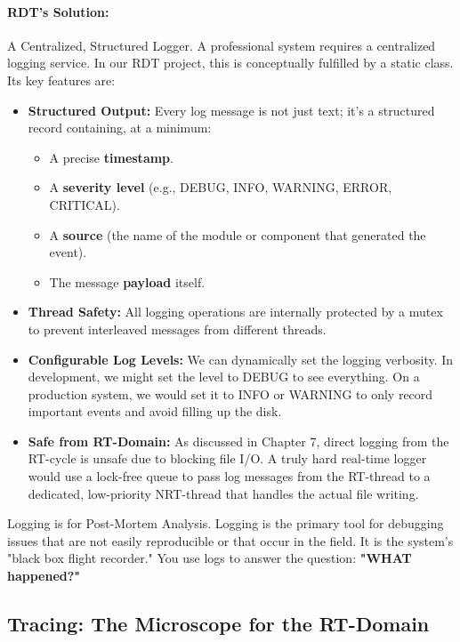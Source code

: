 \paragraph{RDT's Solution:} A Centralized, Structured Logger.
A professional system requires a centralized logging service. In our RDT project, this is conceptually fulfilled by a static  class. Its key features are:
\begin{itemize}
    \item \textbf{Structured Output:} Every log message is not just text; it's a structured record containing, at a minimum:
        \begin{itemize}
            \item A precise \textbf{timestamp}.
            \item A \textbf{severity level} (e.g., DEBUG, INFO, WARNING, ERROR, CRITICAL).
            \item A \textbf{source} (the name of the module or component that generated the event).
            \item The message \textbf{payload} itself.
        \end{itemize}
    \item \textbf{Thread Safety:} All logging operations are internally protected by a mutex to prevent interleaved messages from different threads.
    \item \textbf{Configurable Log Levels:} We can dynamically set the logging verbosity. In development, we might set the level to DEBUG to see everything. On a production system, we would set it to INFO or WARNING to only record important events and avoid filling up the disk.
    \item \textbf{Safe from RT-Domain:} As discussed in Chapter 7, direct logging from the RT-cycle is unsafe due to blocking file I/O. A truly hard real-time logger would use a lock-free queue to pass log messages from the RT-thread to a dedicated, low-priority NRT-thread that handles the actual file writing.
\end{itemize}

\begin{principlebox}{Logging is for Post-Mortem Analysis.}
    Logging is the primary tool for debugging issues that are not easily reproducible or that occur in the field. It is the system's "black box flight recorder." You use logs to answer the question: \textbf{"WHAT happened?"}
\end{principlebox}

\subsection{Tracing: The Microscope for the RT-Domain}
\label{subsec:tracing}

